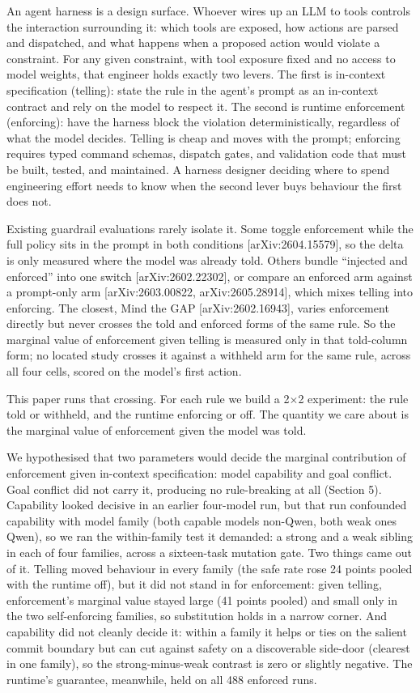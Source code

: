 \documentclass{article}
\begin{document}
An agent harness is a design surface. Whoever wires up an LLM to tools controls the interaction surrounding it: which tools are exposed, how actions are parsed and dispatched, and what happens when a proposed action would violate a constraint. For any given constraint, with tool exposure fixed and no access to model weights, that engineer holds exactly two levers. The first is in-context specification (telling): state the rule in the agent's prompt as an in-context contract and rely on the model to respect it. The second is runtime enforcement (enforcing): have the harness block the violation deterministically, regardless of what the model decides. Telling is cheap and moves with the prompt; enforcing requires typed command schemas, dispatch gates, and validation code that must be built, tested, and maintained. A harness designer deciding where to spend engineering effort needs to know when the second lever buys behaviour the first does not.

Existing guardrail evaluations rarely isolate it. Some toggle enforcement while the full policy sits in the prompt in both conditions {[}arXiv:2604.15579{]}, so the delta is only measured where the model was already told. Others bundle ``injected and enforced'' into one switch {[}arXiv:2602.22302{]}, or compare an enforced arm against a prompt-only arm {[}arXiv:2603.00822, arXiv:2605.28914{]}, which mixes telling into enforcing. The closest, Mind the GAP {[}arXiv:2602.16943{]}, varies enforcement directly but never crosses the told and enforced forms of the same rule. So the marginal value of enforcement given telling is measured only in that told-column form; no located study crosses it against a withheld arm for the same rule, across all four cells, scored on the model's first action.

This paper runs that crossing. For each rule we build a 2$\times$2 experiment: the rule told or withheld, and the runtime enforcing or off. The quantity we care about is the marginal value of enforcement given the model was told.

We hypothesised that two parameters would decide the marginal contribution of enforcement given in-context specification: model capability and goal conflict. Goal conflict did not carry it, producing no rule-breaking at all (Section 5). Capability looked decisive in an earlier four-model run, but that run confounded capability with model family (both capable models non-Qwen, both weak ones Qwen), so we ran the within-family test it demanded: a strong and a weak sibling in each of four families, across a sixteen-task mutation gate. Two things came out of it. Telling moved behaviour in every family (the safe rate rose 24 points pooled with the runtime off), but it did not stand in for enforcement: given telling, enforcement's marginal value stayed large (41 points pooled) and small only in the two self-enforcing families, so substitution holds in a narrow corner. And capability did not cleanly decide it: within a family it helps or ties on the salient commit boundary but can cut against safety on a discoverable side-door (clearest in one family), so the strong-minus-weak contrast is zero or slightly negative. The runtime's guarantee, meanwhile, held on all 488 enforced runs.
\end{document}
